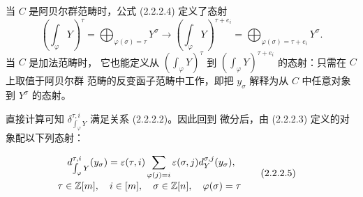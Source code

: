当 $C$ 是阿贝尔群范畴时，公式 (2.2.2.4) 定义了态射
\[
  \left(\int_\varphi Y\right)^\tau
  =\bigoplus_{\varphi(\sigma)=\tau}Y^\sigma
  \longrightarrow
  \left(\int_\varphi Y\right)^{\tau+e_i}
  =\bigoplus_{\varphi(\sigma)=\tau+e_i}Y^\sigma.
\]
当 $C$ 是加法范畴时，
它也能定义从 $\left(\int_\varphi Y\right)^\tau$ 到
$\left(\int_\varphi Y\right)^{\tau+e_i}$ 的态射：只需在 $C$ 上取值于阿贝尔群
范畴的反变函子范畴中工作，即把 $y_\sigma$ 解释为从 $C$ 中任意对象到
$Y^\sigma$ 的态射。

直接计算可知 $\delta_{\int_\varphi Y}^{\tau,i}$ 满足关系 (2.2.2.2)。因此回到
微分后，由 (2.2.2.3) 定义的对象配以下列态射：

\begin{equation}
  \begin{aligned}
    d_{\int_\varphi Y}^{\tau,i}(y_\sigma)
      &=\varepsilon(\tau,i)
        \sum_{\varphi(j)=i}
          \varepsilon(\sigma,j)d_Y^{\sigma,j}(y_\sigma),\\[-1mm]
    &\hspace{-18mm}
      \tau\in\mathbb Z[m],\quad i\in[m],\quad
      \sigma\in\mathbb Z[n],\quad\varphi(\sigma)=\tau
  \end{aligned}
  \tag{2.2.2.5}
\end{equation}
